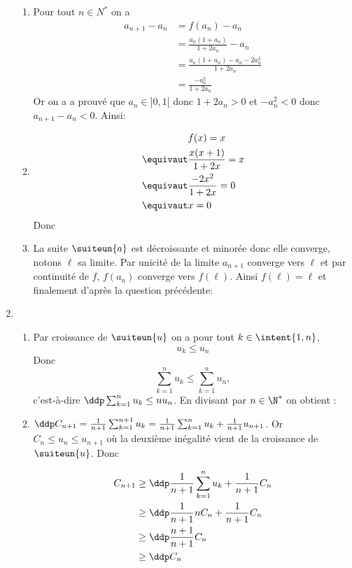 \documentclass[a4paper, 11pt,reqno]{article}
\begin{document}
\begin{correction}
\begin{enumerate}
\begin{enumerate}
\item  Pour tout $n\in N^*$ on a 
\begin{align*}
a_{n+1} -a_n &= f(a_n) -a_n\\
					&= \frac{a_n(1+a_n)}{1+2a_n} - a_n\\
					&=  \frac{a_n(1+a_n) - a_n -2a_n^2}{1+2a_n} \\
					&=  \frac{-a_n^2}{1+2a_n} 
\end{align*}
Or on a a prouvé que $a_n\in ]0,1[$ donc $1+2a_n>0$ et $-a_n^2<0$ donc 
$a_{n+1}-a_n<0$. Ainsi: 

\item
\begin{eqnarray*}
&f(x) = x\\
\equivaut &\frac{x(x+1)}{1+2x}=x\\
\equivaut &\frac{-2x^2}{1+2x}=0\\ 
\equivaut &x=0 
\end{eqnarray*}
Donc 


\item La suite $\suiteun{a}$ est décroissante et minorée donc elle converge, notons $\ell$ sa limite. Par unicité de la limite $a_{n+1} $ converge vers $\ell$ et par continuité de $f$, $f(a_n) $ converge vers $f(\ell)$. 
Ainsi $f(\ell)=\ell$ et finalement d'après la question précédente:  

\end{enumerate}
\item \begin{enumerate}
\item Par croissance de $\suiteun{u}$ on a pour  tout $k\in \intent{1,n}$, 
$$u_k \leq u_n$$
Donc $$\sum_{k=1}^n u_k \leq \sum_{k=1}^n u_n,$$
c'est-à-dire $\ddp \sum_{k=1}^n u_k \leq n u_n$. 
En divisant par $n\in \N^*$ on obtient :

\item 
$\ddp C_{n+1} =\frac{1}{n+1} \sum_{k=1}^{n+1} u_k = \frac{1}{n+1} \sum_{k=1}^{n} u_k +\frac{1}{n+1} u_{n+1}$.
Or $C_n \leq u_n \leq u_{n+1} $ où la deuxième inégalité vient de la croissance de $\suiteun{u}$. Donc

\begin{align*}
C_{n+1} &\geq\ddp \frac{1}{n+1} \sum_{k=1}^{n} u_k + \frac{1}{n+1} C_n\\
			&\geq \ddp \frac{1}{n+1} nC_n + \frac{1}{n+1} C_n\\
			&\geq \ddp\frac{n+1}{n+1} C_n \\
			&\geq\ddp C_n	
\end{align*}


\end{enumerate}
\end{enumerate}
\end{correction}
\end{document}
